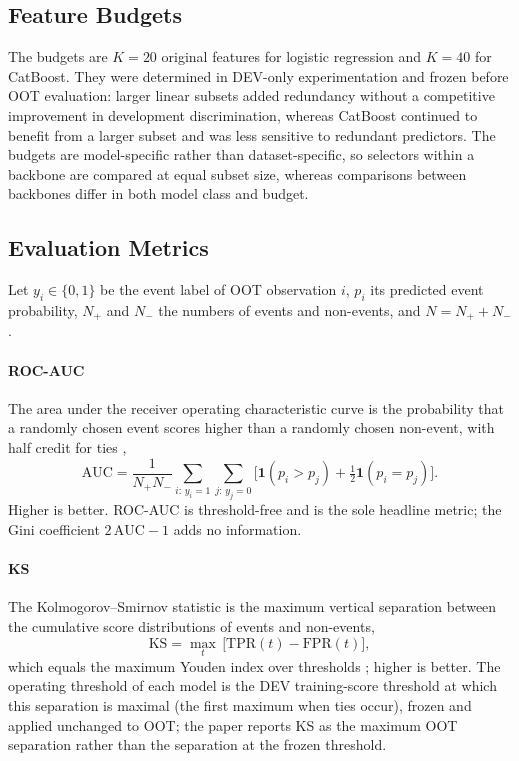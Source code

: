 \documentclass[final,5p,twocolumn]{elsarticle}
\newcommand{\Kfeat}{K}
\newcommand{\AUC}{\mathrm{AUC}}
\newcommand{\KS}{\mathrm{KS}}
\newcommand{\TPR}{\mathrm{TPR}}
\newcommand{\FPR}{\mathrm{FPR}}
\begin{document}
\subsection{Feature Budgets}
\label{subsec:feature_budgets}

The budgets are $\Kfeat=20$ original features for logistic regression and $\Kfeat=40$ for CatBoost. They were determined in DEV-only experimentation and frozen before OOT evaluation: larger linear subsets added redundancy without a competitive improvement in development discrimination, whereas CatBoost continued to benefit from a larger subset and was less sensitive to redundant predictors. The budgets are model-specific rather than dataset-specific, so selectors within a backbone are compared at equal subset size, whereas comparisons between backbones differ in both model class and budget.

\subsection{Evaluation Metrics}
\label{subsec:metrics}

Let $y_i\in\{0,1\}$ be the event label of OOT observation $i$, $p_i$ its predicted event probability, $N_+$ and $N_-$ the numbers of events and non-events, and $N=N_++N_-$.

\paragraph{ROC-AUC}
The area under the receiver operating characteristic curve is the probability that a randomly chosen event scores higher than a randomly chosen non-event, with half credit for ties \cite{hanley1982},
\begin{equation}
    \AUC=\frac{1}{N_+N_-}\sum_{i:\,y_i=1}\sum_{j:\,y_j=0}\big[\mathbf{1}(p_i>p_j)+\tfrac12\mathbf{1}(p_i=p_j)\big].
    \label{eq:roc_auc}
\end{equation}
Higher is better. ROC-AUC is threshold-free and is the sole headline metric; the Gini coefficient $2\,\AUC-1$ adds no information.

\paragraph{KS}
The Kolmogorov--Smirnov statistic is the maximum vertical separation between the cumulative score distributions of events and non-events,
\begin{equation}
    \KS=\max_{t}\,\big[\TPR(t)-\FPR(t)\big],
    \label{eq:ks}
\end{equation}
which equals the maximum Youden index over thresholds \cite{youden1950}; higher is better. The operating threshold of each model is the DEV training-score threshold at which this separation is maximal (the first maximum when ties occur), frozen and applied unchanged to OOT; the paper reports KS as the maximum OOT separation rather than the separation at the frozen threshold.
\end{document}
